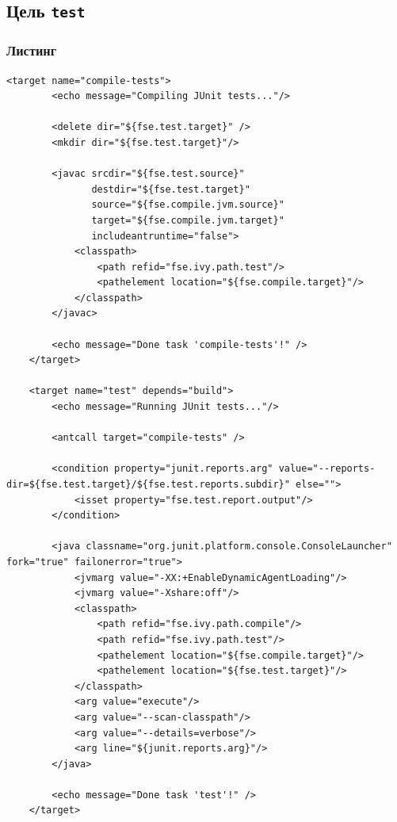 \subsection{Цель \texttt{test}}

\subsubsection{Листинг}

\begin{lstlisting}[caption={Часть содержимого файла \texttt{build.xml}},captionpos=b]
<target name="compile-tests">
        <echo message="Compiling JUnit tests..."/>

        <delete dir="${fse.test.target}" />
        <mkdir dir="${fse.test.target}"/>

        <javac srcdir="${fse.test.source}"
               destdir="${fse.test.target}"
               source="${fse.compile.jvm.source}"
               target="${fse.compile.jvm.target}"
               includeantruntime="false">
            <classpath>
                <path refid="fse.ivy.path.test"/>
                <pathelement location="${fse.compile.target}"/>
            </classpath>
        </javac>

        <echo message="Done task 'compile-tests'!" />
    </target>

    <target name="test" depends="build">
        <echo message="Running JUnit tests..."/>

        <antcall target="compile-tests" />

        <condition property="junit.reports.arg" value="--reports-dir=${fse.test.target}/${fse.test.reports.subdir}" else="">
            <isset property="fse.test.report.output"/>
        </condition>

        <java classname="org.junit.platform.console.ConsoleLauncher" fork="true" failonerror="true">
            <jvmarg value="-XX:+EnableDynamicAgentLoading"/>
            <jvmarg value="-Xshare:off"/>
            <classpath>
                <path refid="fse.ivy.path.compile"/>
                <path refid="fse.ivy.path.test"/>
                <pathelement location="${fse.compile.target}"/>
                <pathelement location="${fse.test.target}"/>
            </classpath>
            <arg value="execute"/>
            <arg value="--scan-classpath"/>
            <arg value="--details=verbose"/>
            <arg line="${junit.reports.arg}"/>
        </java>

        <echo message="Done task 'test'!" />
    </target>
\end{lstlisting}

